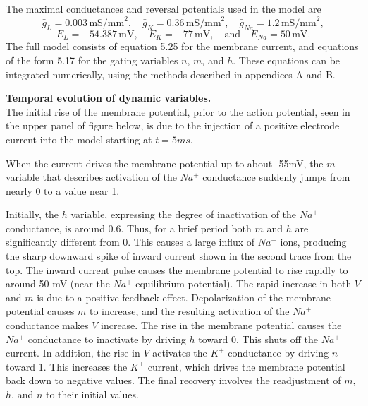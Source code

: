 \documentclass{tufte-handout}
\begin{document}
The maximal conductances and reversal potentials used in the model are
\[
\bar{g}_L = 0.003 \, \text{mS/mm}^2, \quad \bar{g}_K = 0.36 \, \text{mS/mm}^2, \quad \bar{g}_{Na} = 1.2 \, \text{mS/mm}^2,
\]
\[
E_L = -54.387 \, \text{mV}, \quad E_K = -77 \, \text{mV}, \quad \text{and} \quad E_{Na} = 50 \, \text{mV}.
\]
The full model consists of equation 5.25 for the membrane current, and equations of the form 5.17 for the gating variables \(n\), \(m\), and \(h\). These equations can be integrated numerically, using the methods described in appendices A and B.


\textbf{Temporal evolution of dynamic variables.}\\
The initial rise of the membrane potential, prior to the action potential,
seen in the upper panel of figure below, is due to the injection of a
positive electrode current into the model starting at \(t = 5ms\).


When the current drives the membrane potential up to about -55mV, the
\( m \) variable that describes activation of the \(Na^+\) conductance suddenly jumps from 
nearly 0 to a value near 1.

Initially, the \(h\) variable, expressing the degree of inactivation of the \(Na^+\) conductance, is around 0.6. Thus, for a brief period both \(m\) and \(h\) are significantly different from 0. This causes a large influx of \(Na^+\) ions, producing the sharp downward spike of inward current shown in the second trace from the top. The inward current pulse causes the membrane potential to rise rapidly to around 50 mV (near the \(Na^+\) equilibrium potential). The rapid increase in both \(V\) and \(m\) is due to a positive feedback effect. Depolarization of the membrane potential causes \(m\) to increase, and the resulting activation of the \(Na^+\) conductance makes \(V\) increase. The rise in the membrane potential causes the \(Na^+\) conductance to inactivate by driving \(h\) toward 0. This shuts off the \(Na^+\) current. In addition, the rise in \(V\) activates the \(K^+\) conductance by driving \(n\) toward 1. This increases the \(K^+\) current, which drives the membrane potential back down to negative values. The final recovery involves the readjustment of \(m\), \(h\), and \(n\) to their initial values.
\end{document}
